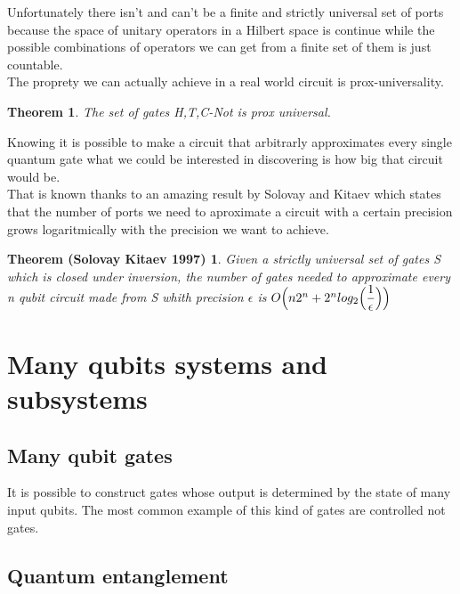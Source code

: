 \documentclass{article}
\newtheorem{Solovay-Kitaev}{Theorem (Solovay Kitaev 1997)}
\newtheorem{Prox-Universal-Set}{Theorem}
\begin{document}
Unfortunately there isn't and can't be a finite and strictly universal
set of ports because the space of unitary operators in a
Hilbert space is continue while the possible combinations of
operators we can get from a finite set of them is just countable.\\
The proprety we can actually achieve in a real world circuit is
prox-universality.\\

\begin{Prox-Universal-Set}
The set of gates {H,T,C-Not} is prox universal.
\end{Prox-Universal-Set}

Knowing it is possible to make a circuit that arbitrarly approximates
every
single quantum gate what we could be interested in discovering is how
big that circuit would be.\\

That is known thanks to an amazing result by Solovay and Kitaev which
states
that the number of ports we need to aproximate a circuit with a certain
precision grows logaritmically with the precision we want to achieve.

\begin{Solovay-Kitaev}

Given a strictly universal set of gates S which is closed under inversion,
the number of gates needed to approximate every n qubit circuit made
from S whith precision $\epsilon$ is
$O\Bigl(n2^n+2^nlog_2 \Bigl( \dfrac{1}{\epsilon}\Bigl)\Bigl)$


\end{Solovay-Kitaev}


\newpage

\section{Many qubits systems and subsystems}



\subsection{Many qubit gates}
It is possible to construct gates whose output is determined by the state
of many input qubits.
The most common example of this kind of gates are controlled not gates.


\subsection{Quantum entanglement}
\end{document}
